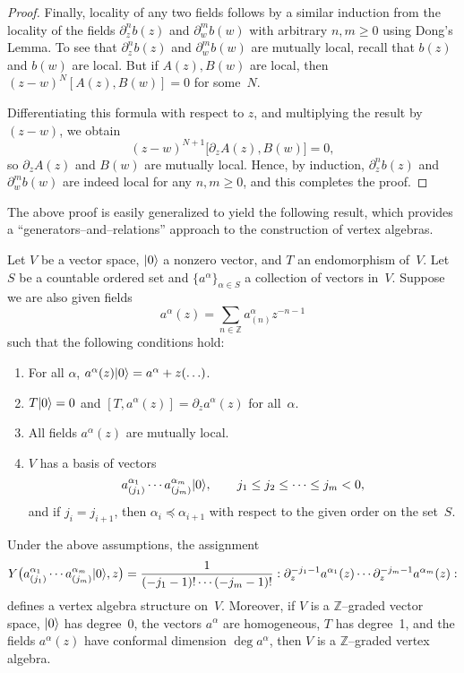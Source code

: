 \documentclass[12pt]{article}
\begin{document}
\begin{proof}
    Finally, locality of any two fields follows by a similar induction from the locality
    of the fields $\partial_z^n b(z)$ and $\partial_w^m b(w)$ with arbitrary $n,m\ge0$
    using Dong’s Lemma.
    To see that $\partial_z^n b(z)$ and $\partial_w^m b(w)$ are mutually local,
    recall that $b(z)$ and $b(w)$ are local.
    But if $A(z),B(w)$ are local, then $(z-w)^N [A(z),B(w)]=0$ for some~$N$.

    Differentiating this formula with respect to $z$, and multiplying the result by $(z-w)$,
    we obtain
    \[
        (z-w)^{N+1}\big[\partial_z A(z),B(w)\big]=0,
    \]
    so $\partial_z A(z)$ and $B(w)$ are mutually local.
    Hence, by induction, $\partial_z^n b(z)$ and $\partial_w^m b(w)$
    are indeed local for any $n,m\ge0$, and this completes the proof.
\end{proof}

The above proof is easily generalized to yield the following result,
which provides a ``generators–and–relations'' approach to the construction of vertex algebras.

Let $V$ be a vector space, $\lvert 0 \rangle$ a nonzero vector, and $T$ an endomorphism of~$V$.
Let $S$ be a countable ordered set and $\{a^\alpha\}_{\alpha\in S}$ a collection of vectors in~$V$.
Suppose we are also given fields
\[
    a^\alpha(z) = \sum_{n\in\mathbb{Z}} a^\alpha_{(n)} z^{-n-1}
\]
such that the following conditions hold:
\begin{enumerate}
    \item For all $\alpha$, $a^\alpha(z)\lvert 0 \rangle = a^\alpha + z(\ldots)$.
    \item $T\lvert 0 \rangle=0$ and $[T,a^\alpha(z)] = \partial_z a^\alpha(z)$ for all~$\alpha$.
    \item All fields $a^\alpha(z)$ are mutually local.
    \item $V$ has a basis of vectors
          \[
              a^{\alpha_1}_{(j_1)} \cdots a^{\alpha_m}_{(j_m)} \lvert 0 \rangle,
              \qquad
              j_1\le j_2 \le \cdots \le j_m < 0,
          \]
          and if $j_i=j_{i+1}$, then $\alpha_i \preceq \alpha_{i+1}$
          with respect to the given order on the set~$S$.
\end{enumerate}

\begin{theorem}
    Under the above assumptions, the assignment
    \begin{equation}\label{2.3.8}
        Y\big(a^{\alpha_1}_{(j_1)}\cdots a^{\alpha_m}_{(j_m)}\lvert 0 \rangle,z\big)
        =\frac{1}{(-j_1-1)!\cdots(-j_m-1)!}
        :\partial_z^{-j_1-1} a^{\alpha_1}(z)\cdots \partial_z^{-j_m-1} a^{\alpha_m}(z):
    \end{equation}
    defines a vertex algebra structure on~$V$.
    Moreover, if $V$ is a $\mathbb{Z}$–graded vector space,
    $\lvert 0 \rangle$ has degree~0, the vectors $a^\alpha$ are homogeneous,
    $T$ has degree~1, and the fields $a^\alpha(z)$ have conformal dimension
    $\deg a^\alpha$, then $V$ is a $\mathbb{Z}$–graded vertex algebra.
\end{theorem}
\end{document}
